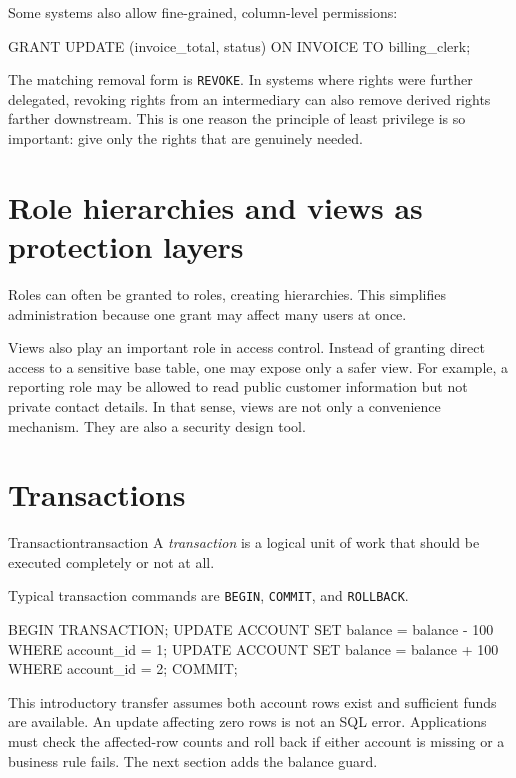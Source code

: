 \documentclass[11pt,a4paper,openany]{book}
\begin{document}
Some systems also allow fine-grained, column-level permissions:
\begin{codesql}
GRANT UPDATE (invoice_total, status)
ON INVOICE
TO billing_clerk;
\end{codesql}

The matching removal form is \texttt{REVOKE}. In systems where rights were further delegated, revoking rights from an intermediary can also remove derived rights farther downstream. This is one reason the principle of least privilege is so important: give only the rights that are genuinely needed.

\section{Role hierarchies and views as protection layers}
Roles can often be granted to roles, creating hierarchies. This simplifies administration because one grant may affect many users at once.

Views also play an important role in access control. Instead of granting direct access to a sensitive base table, one may expose only a safer view. For example, a reporting role may be allowed to read public customer information but not private contact details. In that sense, views are not only a convenience mechanism. They are also a security design tool.

\section{Transactions}
\begin{definition}{Transaction}{transaction}
A \emph{transaction} is a logical unit of work that should be executed completely or not at all.
\end{definition}

Typical transaction commands are \texttt{BEGIN}, \texttt{COMMIT}, and \texttt{ROLLBACK}.

\begin{codesql}
BEGIN TRANSACTION;
UPDATE ACCOUNT SET balance = balance - 100 WHERE account_id = 1;
UPDATE ACCOUNT SET balance = balance + 100 WHERE account_id = 2;
COMMIT;
\end{codesql}

This introductory transfer assumes both account rows exist and sufficient funds are available. An update affecting zero rows is not an SQL error. Applications must check the affected-row counts and roll back if either account is missing or a business rule fails. The next section adds the balance guard.
\end{document}
